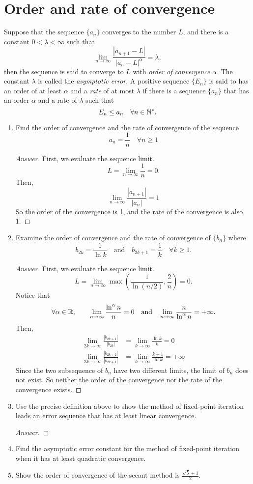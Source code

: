 \section{Order and rate of convergence}
Suppose that the sequence \(\{a_n\}\) converges to the number $L$, and there is a constant \(0<\lambda<\infty\) such that
\[ \lim_{n\to\infty} \frac{|a_{n+1}-L|}{|a_n-L|^\alpha}=\lambda, \]
then the sequence is said to converge to $L$ with \emph{order of convergence} $\alpha$.
The constant $\lambda$ is called the \emph{asymptotic error}.
A positive sequence \(\{E_n\}\) is said to has an order of at least $\alpha$ and a \emph{rate} of at most $\lambda$ if there is a sequence \(\{a_n\}\) that has an order $\alpha$ and a rate of $\lambda$ such that
\[ E_n\leq a_n \quad \forall n\in\mathbb{N}^*. \]
\begin{enumerate}
	\item Find the order of convergence and the rate of convergence of the sequence
	\[ a_n=\frac{1}{n} \quad \forall n\geq1 \]
	\begin{proof}[Answer]
	First, we evaluate the sequence limit.
	\[ L=\lim_{n\to\infty}\frac{1}{n}=0. \]
	Then,
	\[ \lim_{n\to\infty}\frac{|a_{n+1}|}{|a_n|}=1 \]
	So the order of the convergence is 1, and the rate of the convergence is also 1.
	\end{proof}
	\item Examine the order of convergence and the rate of convergence of \(\{b_n\}\) where
	\[ b_{2k}=\frac{1}{\ln k} \quad \text{and} \quad b_{2k+1}=\frac{1}{k} \quad \forall k\geq1. \]
	\begin{proof}[Answer]
	First, we evaluate the sequence limit.
	\[ L=\lim_{n\to\infty}\max\left(\frac{1}{\ln (n/2)},\frac{2}{n}\right)=0. \]
	Notice that
	\[ \forall \alpha\in\mathbb{R},\qquad \lim_{n\to\infty}\frac{\ln^\alpha n}{n}=0 \quad\text{and}\quad \lim_{n\to\infty}\frac{n}{\ln^\alpha n}=+\infty. \]
	Then,
	\begin{align*}
		\lim_{2k\to\infty}\frac{|b_{2k+1}|}{|b_{2k}|}&=\lim_{k\to\infty}\frac{\ln k}{k}=0\\
		\lim_{2k\to\infty}\frac{|b_{2k+2}|}{|b_{2k+1}|}&=\lim_{k\to\infty}\frac{k+1}{\ln k}=+\infty
	\end{align*}
	Since the two subsequence of \(b_n\) have two different limits, the limit of \(b_n\) does not exist.
	So neither the order of the convergence nor the rate of the convergence exists.
	\end{proof}
	\item Use the precise definition above to show the method of fixed-point iteration leads an error sequence that has at least linear convergence.
	\begin{proof}[Answer]
	
	\end{proof}
	\item Find the asymptotic error constant for the method of fixed-point iteration when it has at least quadratic convergence.
	
	\item Show the order of convergence of the secant method is \(\frac{\sqrt{5}+1}{2} \).
\end{enumerate}


